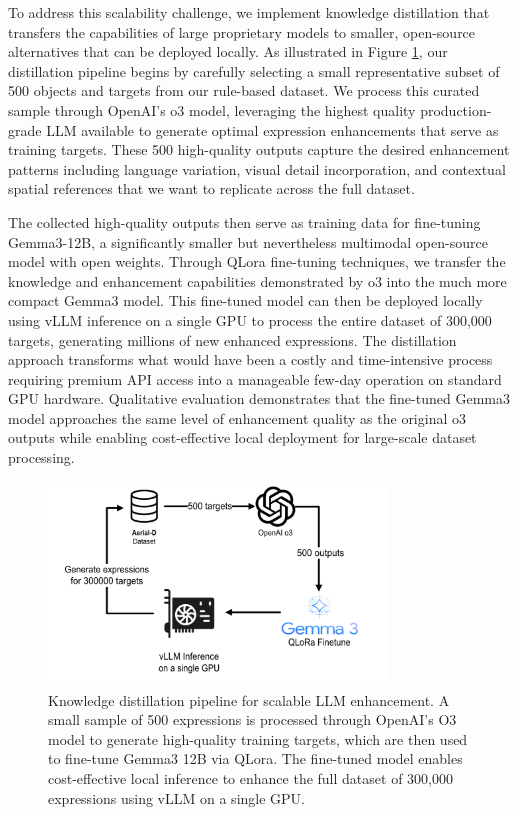 To address this scalability challenge, we implement knowledge distillation that transfers the capabilities of large proprietary models to smaller, open-source alternatives that can be deployed locally. As illustrated in Figure \ref{fig:llm_distillation}, our distillation pipeline begins by carefully selecting a small representative subset of 500 objects and targets from our rule-based dataset. We process this curated sample through OpenAI's o3 model, leveraging the highest quality production-grade LLM available to generate optimal expression enhancements that serve as training targets. These 500 high-quality outputs capture the desired enhancement patterns including language variation, visual detail incorporation, and contextual spatial references that we want to replicate across the full dataset.

The collected high-quality outputs then serve as training data for fine-tuning Gemma3-12B, a significantly smaller but nevertheless multimodal open-source model with open weights. Through QLora fine-tuning techniques, we transfer the knowledge and enhancement capabilities demonstrated by o3 into the much more compact Gemma3 model. This fine-tuned model can then be deployed locally using vLLM inference on a single GPU to process the entire dataset of 300,000 targets, generating millions of new enhanced expressions. The distillation approach transforms what would have been a costly and time-intensive process requiring premium API access into a manageable few-day operation on standard GPU hardware. Qualitative evaluation demonstrates that the fine-tuned Gemma3 model approaches the same level of enhancement quality as the original o3 outputs while enabling cost-effective local deployment for large-scale dataset processing.

\begin{figure}[H]
\centering
\includegraphics[width=0.8\textwidth]{Images/distillation.png}
\caption{Knowledge distillation pipeline for scalable LLM enhancement. A small sample of 500 expressions is processed through OpenAI's O3 model to generate high-quality training targets, which are then used to fine-tune Gemma3 12B via QLora. The fine-tuned model enables cost-effective local inference to enhance the full dataset of 300,000 expressions using vLLM on a single GPU.}
\label{fig:llm_distillation}
\end{figure}



